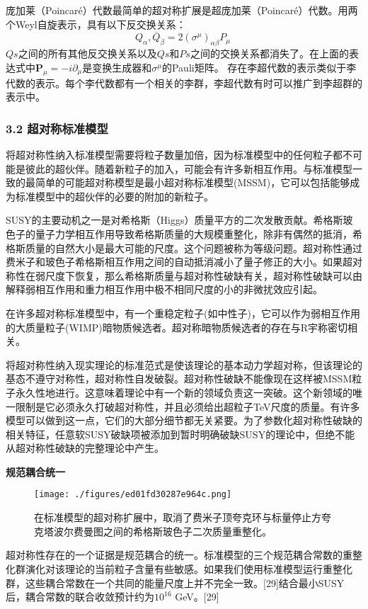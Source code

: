 庞加莱（Poincaré）代数最简单的超对称扩展是超庞加莱（Poincaré）代数。用两个Weyl自旋表示，具有以下反交换关系：
$${Q_\alpha, \overline{Q}_{\dot{\beta}}} = 2 (\sigma^\mu)_{\alpha \dot{\beta}} P_\mu~$$
$Qs$之间的所有其他反交换关系以及$Qs$和$Ps$之间的交换关系都消失了。在上面的表达式中$\mathbf{P}_\mu = -i \partial_\mu$是变换生成器和$\sigma^\mu$的Pauli矩阵。
存在李超代数的表示类似于李代数的表示。每个李代数都有一个相关的李群，李超代数有时可以推广到李超群的表示中。
\subsubsection{3.2 超对称标准模型}
将超对称性纳入标准模型需要将粒子数量加倍，因为标准模型中的任何粒子都不可能是彼此的超伙伴。随着新粒子的加入，可能会有许多新相互作用。与标准模型一致的最简单的可能超对称模型是最小超对称标准模型(MSSM)，它可以包括能够成为标准模型中的超伙伴的必要的附加的新粒子。

SUSY的主要动机之一是对希格斯（Higgs）质量平方的二次发散贡献。希格斯玻色子的量子力学相互作用导致希格斯质量的大规模重整化，除非有偶然的抵消，希格斯质量的自然大小是最大可能的尺度。这个问题被称为等级问题。超对称性通过费米子和玻色子希格斯相互作用之间的自动抵消减小了量子修正的大小。如果超对称性在弱尺度下恢复，那么希格斯质量与超对称性破缺有关，超对称性破缺可以由解释弱相互作用和重力相互作用中极不相同尺度的小的非微扰效应引起。

在许多超对称标准模型中，有一个重稳定粒子(如中性子)，它可以作为弱相互作用的大质量粒子(WIMP)暗物质候选者。超对称暗物质候选者的存在与R宇称密切相关。

将超对称性纳入现实理论的标准范式是使该理论的基本动力学超对称，但该理论的基态不遵守对称性，超对称性自发破裂。超对称性破缺不能像现在这样被MSSM粒子永久性地进行。这意味着理论中有一个新的领域负责这一突破。这个新领域的唯一限制是它必须永久打破超对称性，并且必须给出超粒子TeV尺度的质量。有许多模型可以做到这一点，它们的大部分细节都无关紧要。为了参数化超对称性破缺的相关特征，任意软SUSY破缺项被添加到暂时明确破缺SUSY的理论中，但绝不能从超对称性破缺的完整理论中产生。

\textbf{规范耦合统一}

\begin{figure}[ht]
\centering
\texttt{[image: ./figures/ed01fd30287e964c.png]}
\caption{在标准模型的超对称扩展中，取消了费米子顶夸克环与标量停止方夸克塔波尔费曼图之间的希格斯玻色子二次质量重整化。} \label{fig_CDCX_1}
\end{figure}
超对称性存在的一个证据是规范耦合的统一。标准模型的三个规范耦合常数的重整化群演化对该理论的当前粒子含量有些敏感。如果我们使用标准模型运行重整化群，这些耦合常数在一个共同的能量尺度上并不完全一致。[29]结合最小SUSY后，耦合常数的联合收敛预计约为$10^{16}$ GeV。[29]
